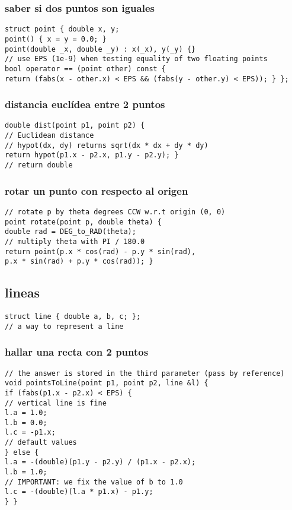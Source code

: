 \subsubsection{saber si dos puntos son iguales}
\begin{lstlisting}[style=C]
struct point { double x, y;
point() { x = y = 0.0; }
point(double _x, double _y) : x(_x), y(_y) {}
// use EPS (1e-9) when testing equality of two floating points
bool operator == (point other) const {
return (fabs(x - other.x) < EPS && (fabs(y - other.y) < EPS)); } };
\end{lstlisting}
\subsubsection{distancia euclídea entre 2 puntos}
\begin{lstlisting}[style=C]
double dist(point p1, point p2) {
// Euclidean distance
// hypot(dx, dy) returns sqrt(dx * dx + dy * dy)
return hypot(p1.x - p2.x, p1.y - p2.y); }
// return double
\end{lstlisting}
\subsubsection{rotar un punto con respecto al origen}
\begin{lstlisting}[style=C]
// rotate p by theta degrees CCW w.r.t origin (0, 0)
point rotate(point p, double theta) {
double rad = DEG_to_RAD(theta);
// multiply theta with PI / 180.0
return point(p.x * cos(rad) - p.y * sin(rad),
p.x * sin(rad) + p.y * cos(rad)); }
\end{lstlisting}
\subsection{lineas}
\begin{lstlisting}[style=C]
struct line { double a, b, c; };
// a way to represent a line
\end{lstlisting}
\subsubsection{hallar una recta con 2 puntos}
\begin{lstlisting}[style=C]
// the answer is stored in the third parameter (pass by reference)
void pointsToLine(point p1, point p2, line &l) {
if (fabs(p1.x - p2.x) < EPS) {
// vertical line is fine
l.a = 1.0;
l.b = 0.0;
l.c = -p1.x;
// default values
} else {
l.a = -(double)(p1.y - p2.y) / (p1.x - p2.x);
l.b = 1.0;
// IMPORTANT: we fix the value of b to 1.0
l.c = -(double)(l.a * p1.x) - p1.y;
} }
\end{lstlisting}
